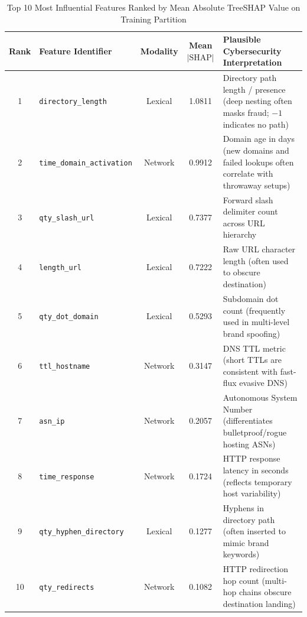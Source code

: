 \begin{table}[t]
\caption{Top 10 Most Influential Features Ranked by Mean Absolute TreeSHAP Value on Training Partition}
\label{tab:shap_features}
\centering
\begin{tabular}{clccp{10.5cm}}
\hline
\textbf{Rank} & \textbf{Feature Identifier} & \textbf{Modality} & \textbf{Mean $|\text{SHAP}|$} & \textbf{Plausible Cybersecurity Interpretation} \\
\hline
1 & \texttt{directory\_length} & Lexical & 1.0811 & Directory path length / presence (deep nesting often masks fraud; $-1$ indicates no path) \\
2 & \texttt{time\_domain\_activation} & Network & 0.9912 & Domain age in days (new domains and failed lookups often correlate with throwaway setups) \\
3 & \texttt{qty\_slash\_url} & Lexical & 0.7377 & Forward slash delimiter count across URL hierarchy \\
4 & \texttt{length\_url} & Lexical & 0.7222 & Raw URL character length (often used to obscure destination) \\
5 & \texttt{qty\_dot\_domain} & Lexical & 0.5293 & Subdomain dot count (frequently used in multi-level brand spoofing) \\
6 & \texttt{ttl\_hostname} & Network & 0.3147 & DNS TTL metric (short TTLs are consistent with fast-flux evasive DNS) \\
7 & \texttt{asn\_ip} & Network & 0.2057 & Autonomous System Number (differentiates bulletproof/rogue hosting ASNs) \\
8 & \texttt{time\_response} & Network & 0.1724 & HTTP response latency in seconds (reflects temporary host variability) \\
9 & \texttt{qty\_hyphen\_directory} & Lexical & 0.1277 & Hyphens in directory path (often inserted to mimic brand keywords) \\
10 & \texttt{qty\_redirects} & Network & 0.1082 & HTTP redirection hop count (multi-hop chains obscure destination landing) \\
\hline
\end{tabular}
\end{table}
